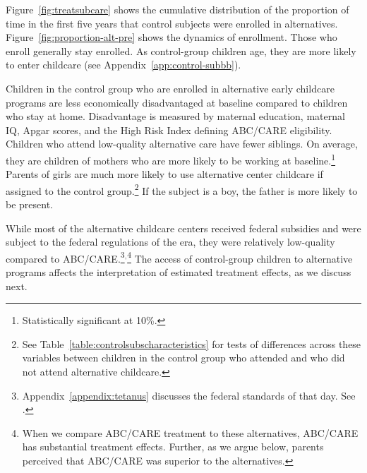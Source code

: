 Figure~\ref{fig:treatsubcare} shows the cumulative distribution of the proportion of time in the first five years that control subjects were enrolled in alternatives. Figure~\ref{fig:proportion-alt-pre} shows the dynamics of enrollment. Those who enroll generally stay enrolled. As control-group children age, they are more likely to enter childcare (see Appendix~\ref{app:control-subbb}).

Children in the control group who are enrolled in alternative early childcare programs are less economically disadvantaged at baseline compared to children who stay at home. Disadvantage is measured by maternal education, maternal IQ, Apgar scores, and the High Risk Index defining ABC/CARE eligibility. Children who attend low-quality alternative care have fewer siblings. On average, they are children of mothers who are more likely to be working at baseline.\footnote{Statistically significant at 10\%.} Parents of girls are much more likely to use alternative center childcare if assigned to the control group.\footnote{See Table~\ref{table:controlsubscharacteristics} for tests of differences across these variables between children in the control group who attended and who did not attend alternative childcare.} If the subject is a boy, the father is more likely to be present.

While most of the alternative childcare centers received federal subsidies and were subject to the federal regulations of the era, they were relatively low-quality compared to ABC/CARE.\footnote{Appendix~\ref{appendix:tetanus} discusses the federal standards of that day. See \citet{Department-of-Health_1968_DayCareRequirements,NCGA_1971_House-Bill-100,Ramey-et-al_1977_Intro-to-ABC,Ramey_Campbell_1979_SR,Ramey_McGinness_etal_1982_Abecedarianapproach, Burchinal_Campbell_etal_1997_CD}.}$^,$\footnote{When we compare ABC/CARE treatment to these alternatives, ABC/CARE has substantial treatment effects. Further, as we argue below, parents perceived that ABC/CARE was superior to the alternatives.} The access of control-group children to alternative programs affects the interpretation of estimated treatment effects, as we discuss next.

